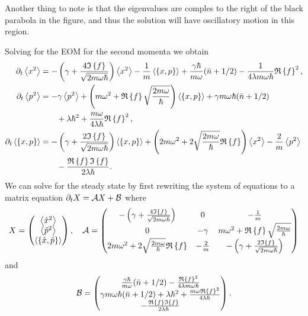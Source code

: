 Another thing to note is that the eigenvalues are comples to the right of the black parabola in the figure, and thus the solution will have oscillatory motion in this region.

Solving for the EOM for the second momenta we obtain
\begin{align}
    \dt \expval{x^2} &= -\left(\gamma + \frac{4\im{f}}{\sqrt{2 m \omega \hbar}}\right) \expval{x^2} - \frac{1}{m} \expval{\acomm{x}{p}} + \frac{\gamma \hbar}{m \omega} (\nbar + 1/2) - \frac{1}{4\lambda m \omega \hbar} \re{f}^2,\\
    \dt \expval{p^2} &=  -\gamma \expval{p^2} + \left( m\omega^2 + \re{f} \sqrt{\frac{2m \omega}{\hbar}} \right)\expval{\acomm{x}{p}} + \gamma m \omega \hbar (\nbar + 1/2) \nonumber \\
    &\qquad+ \lambda \hbar^2 + \frac{m \omega}{4 \lambda \hbar}\re{f}^2 ,\\
    \dt \expval{\acomm{x}{p}} &= -\left(\gamma + \frac{2\im{f}}{\sqrt{2m \omega \hbar}}  \right)\expval{\acomm{x}{p}} + \left(2 m \omega^2 + 2 \sqrt{\frac{2 m \omega}{\hbar}}\re{f} \right) \expval{x^2} - \frac{2}{m} \expval{p^2}\nonumber\\ 
    &\qquad - \frac{\re{f} \im{f}}{2 \lambda \hbar}.
\end{align}
We can solve for the steady state by first rewriting the system of equations to a matrix equation $\partial_t X = \mathcal{A} X + \mathcal{B}$ where
\begin{equation}
    X =
    \begin{pmatrix}
        \expval{\xop^2}\\
        \expval{\pop^2}\\
        \expval{\acomm{\xop}{\pop}}    
    \end{pmatrix}, \quad
    \mathcal{A} = \begin{pmatrix}
        -\left(\gamma + \frac{4\im{f}}{\sqrt{2 m \omega \hbar}}\right) & 0 & -\frac{1}{m} \\
        0 & -\gamma & m\omega^2 + \re{f} \sqrt{\frac{2m \omega}{\hbar}} \\
        2 m \omega^2 + 2 \sqrt{\frac{2 m \omega}{\hbar}}\re{f} & -\frac{2}{m} & -\left(\gamma +\frac{2\im{f}}{\sqrt{2m \omega \hbar}}\right) \label{eq:matrixA}
    \end{pmatrix}
\end{equation}
and
\begin{equation}
    \mathcal{B} = 
    \begin{pmatrix}
        \frac{\gamma \hbar}{m \omega} (\bar{n} + 1/2) - \frac{\mathfrak{R}\left\{f\right\}^2}{4\lambda m \omega \hbar}\\
        \gamma m \omega \hbar (\bar{n} + 1/2) + \lambda \hbar^2 +\frac{m \omega \mathfrak{R}\left\{f\right\}^2}{4 \lambda \hbar}\\
        -\frac{\mathfrak{R}\left\{f\right\} \mathfrak{I}\left\{f\right\}}{2 \lambda \hbar}
    \end{pmatrix}.
\end{equation}
